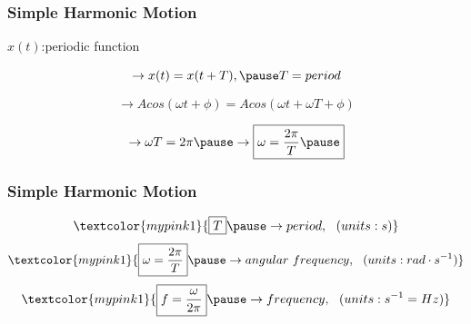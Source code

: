 \documentclass[]{beamer}
\begin{document}


\begin{frame}
\frametitle{Simple Harmonic Motion}



 $x(t)$:periodic function

\pause

\begin{equation}
\rightarrow x(t)=x(t+T), \pause T=period
\end{equation}

\pause


\begin{equation}
  \rightarrow  Acos(\omega t+\phi)=Acos(\omega t+\omega T +\phi)
\end{equation}

\pause

\vspace{3mm}



\begin{equation}
  \rightarrow  \omega T=2\pi \pause\rightarrow \boxed{\omega=\frac{2\pi}{T}\pause }
\end{equation}



  \end{frame}


\begin{frame}
  \frametitle{Simple Harmonic Motion}
  
  \begin{equation}
    \textcolor{mypink1}{\boxed{T}\pause   
    \rightarrow period,~~(units:s)}
  \end{equation}
  \pause
  \begin{equation}
    \textcolor{mypink1}{\boxed{\omega=\frac{2\pi}{T}}\pause   
    \rightarrow angular~frequency,~~(units:rad \cdot s^{-1 })}
  \end{equation}
\pause
 \begin{equation}
   \textcolor{mypink1}{\boxed{f=\frac{\omega}{2\pi}}\pause    \rightarrow frequency,~~(units: s^{-1 }= Hz)}
 \end{equation}


\end{frame}

\end{document}
